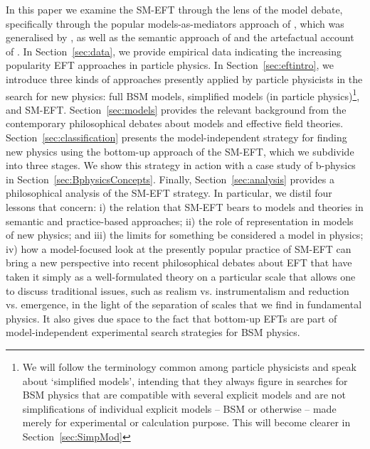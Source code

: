 In this paper we examine the SM-EFT through the lens of the model debate, specifically through the popular models-as-mediators approach of \citet{morganmorrison}, which was generalised by \citet{mccoymassimi}, as well as the semantic approach of \citet{hartmann1999} and the artefactual account of \citet{knuuttila2011}. 
In Section~\ref{sec:data}, we provide empirical data indicating the increasing popularity EFT approaches in particle physics. 
In Section~\ref{sec:eftintro}, we introduce three kinds of approaches presently applied by particle physicists in the search for new physics: full BSM models, simplified models (in particle physics)\footnote{We will follow the terminology common among particle physicists and speak about ‘simplified models’, intending that they always figure in searches for BSM physics that are compatible with several explicit models and are not simplifications of individual explicit models – BSM or otherwise – made merely for experimental or calculation purpose. This will become clearer in Section~\ref{sec:SimpMod}}, and SM-EFT. 
Section~\ref{sec:models} provides the relevant background from the contemporary philosophical debates about models and effective field theories. 
Section~\ref{sec:classification} presents the model-independent strategy for finding new physics using the bottom-up approach of the SM-EFT, which we subdivide into three stages.
We show this strategy in action with a case study of b-physics in Section~\ref{sec:BphysicsConcepts}. 
Finally, Section~\ref{sec:analysis} provides a philosophical analysis of the SM-EFT strategy.  
In particular, we distil four lessons that concern: i) the relation that SM-EFT bears to models and theories in semantic and practice-based approaches; ii) the role of representation in models of new physics; and iii) the limits for something be considered a model in physics; iv) how a model-focused look at the presently popular practice of SM-EFT can bring a new perspective into recent philosophical debates about EFT that have taken it simply as a well-formulated theory on a particular scale that allows one to discuss traditional issues, such as realism vs. instrumentalism and reduction vs. emergence, in the light of the separation of scales that we find in fundamental physics. It also gives due space to the fact that bottom-up EFTs are part of model-independent experimental search strategies for BSM physics.
